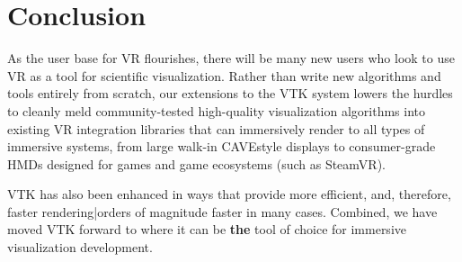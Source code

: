 \section{Conclusion}

As the user base for VR flourishes, there will be many
new users who look to use VR as a tool for scientific visualization.
Rather than write new algorithms and tools entirely from scratch,
our extensions to the VTK system lowers the hurdles to cleanly
meld community-tested high-quality visualization algorithms into
existing VR integration libraries that can immersively render to
all types of immersive systems, from large walk-in CAVE\texttrademark style displays
to consumer-grade HMDs designed for games and game ecosystems (such
as SteamVR).

VTK has also been enhanced in ways that provide more efficient, and,
therefore, faster rendering|orders of magnitude faster in many cases.
Combined, we have moved VTK forward to where it can be \textbf{the}
tool of choice for immersive visualization development.

